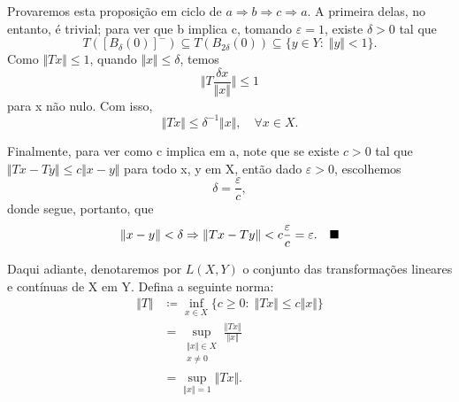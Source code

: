 \documentclass[../functional_analysis.tex]{subfiles}
\begin{document}
\begin{proof*}
  Provaremos esta proposição em ciclo de \(a \Rightarrow b \Rightarrow c \Rightarrow a.\) A primeira delas, no entanto, é trivial; para ver que b implica c, tomando \(\varepsilon =1\), existe \( \delta >0\) tal que 
    \[
      T([B_\delta (0)]^{-})\subseteq T(B_{2\delta }(0)) \subseteq \{y\in Y:\; \Vert y \Vert<1\}.
    \]
    Como \(\Vert Tx \Vert\leq 1\), quando \(\Vert x \Vert\leq \delta \), temos 
      \[
        \biggl\Vert T \frac{\delta x}{\Vert x \Vert} \biggr\Vert\leq 1
      \]
      para x não nulo. Com isso, 
        \[
          \Vert Tx \Vert \leq \delta^{-1}\Vert x \Vert,\quad \forall x\in X.
        \]

        Finalmente, para ver como c implica em a, note que se existe \(c>0\) tal que \(\Vert Tx - Ty \Vert\leq c \Vert x-y \Vert\) para todo x, y em X, então dado \(\varepsilon >0\), escolhemos 
          \[
            \delta = \frac{\varepsilon }{c},
          \]
          donde segue, portanto, que
            \[
              \Vert x-y \Vert<\delta  \Rightarrow \Vert Tx - Ty \Vert < c \frac{\varepsilon }{c} = \varepsilon .\quad \text{$\blacksquare$}
            \]
\end{proof*}

\begin{example}
  Daqui adiante, denotaremos por \(L(X, Y)\) o conjunto das transformações lineares e contínuas de X em Y. Defina a seguinte norma: 
 \begin{align*}
   \Vert T \Vert&\coloneqq \inf_{x\in X}\{c\geq 0:\; \Vert Tx \Vert\leq c \Vert x \Vert\}\\
                & = \sup_{\substack{\Vert x \Vert\in X \\ x\neq0}} \frac{\Vert Tx \Vert}{\Vert x \Vert}\\ 
                & = \sup_{\Vert x \Vert=1} \Vert Tx \Vert.
 \end{align*}
\end{example}
 
\end{document}
